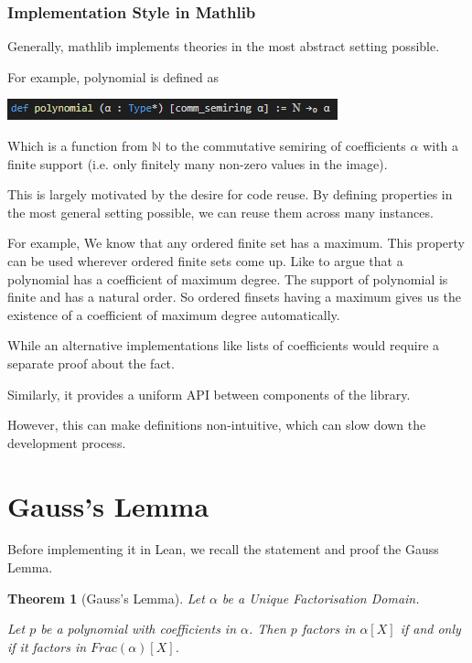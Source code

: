 \documentclass[pagesize=a4]{scrreprt}
\newcommand{\N}{\mathbb{N}}
\newtheorem{theorem}{Theorem}
\begin{document}
\subsubsection{Implementation Style in Mathlib}

Generally, mathlib implements theories in the most abstract setting possible. 

For example, polynomial is defined as

\includegraphics{polynomial.png}

Which is a function from $\N$ to the commutative semiring of coefficients $\alpha$ with a finite support (i.e. only finitely many non-zero values in the image). 

  This is largely motivated by the desire for code reuse. By defining properties in the most general setting possible, we can reuse them across many instances.

 For example, We know that any ordered finite set has a maximum. This property can be used wherever ordered finite sets come up. 
        Like to argue that a polynomial has a coefficient of maximum degree. The support of polynomial is finite and has a natural order. So ordered finsets having a maximum gives us the existence of a coefficient of maximum degree automatically.


 While an alternative implementations like lists of coefficients would require a separate proof about the fact. 


 Similarly, it provides a uniform API between components of the library. 

 However, this can make definitions non-intuitive, which can slow down the development process. 


\section{Gauss's Lemma}

Before implementing it in Lean, we recall the statement and proof the Gauss Lemma. 

\begin{theorem}[Gauss's Lemma]
    Let $\alpha$ be a Unique Factorisation Domain. 

    Let $p$ be a polynomial with coefficients in $\alpha$. Then $p$ factors in $\alpha[X]$ if and only if it factors in $Frac(\alpha)[X]$.
\end{theorem}
\end{document}
